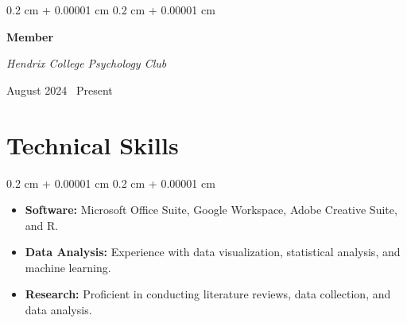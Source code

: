 \documentclass[10pt, letterpaper]{article}
\newenvironment{highlights}{
    \begin{itemize}[
        topsep=0.10 cm,
        parsep=0.10 cm,
        partopsep=0pt,
        itemsep=0pt,
        leftmargin=0.4 cm + 10pt
    ]
}{
    \end{itemize}
} %
\newenvironment{onecolentry}{
    \begin{adjustwidth}{
        0.2 cm + 0.00001 cm
    }{
        0.2 cm + 0.00001 cm
    }
}{
    \end{adjustwidth}
} %
\newenvironment{twocolentry}[2][]{
    \onecolentry
    \def\secondColumn{#2}
    \setcolumnwidth{\fill, 4.5 cm}
    \begin{paracol}{2}
}{
    \switchcolumn \raggedleft \secondColumn
    \end{paracol}
    \endonecolentry
} %
\begin{document}
\begin{twocolentry}{
        

        August 2024 \textendash\ Present
    }

    \textbf{Member}

    \textit{Hendrix College Psychology Club}

    \vspace{0.10 cm}
\end{twocolentry}








\section{Technical Skills}

\begin{onecolentry}
    \begin{highlights}
        \item \textbf{Software:} Microsoft Office Suite, Google Workspace, Adobe Creative Suite, and R.
        \item \textbf{Data Analysis:} Experience with data visualization, statistical analysis, and machine learning.
        \item \textbf{Research:} Proficient in conducting literature reviews, data collection, and data analysis.
    \end{highlights}
\end{onecolentry}
\end{document}
